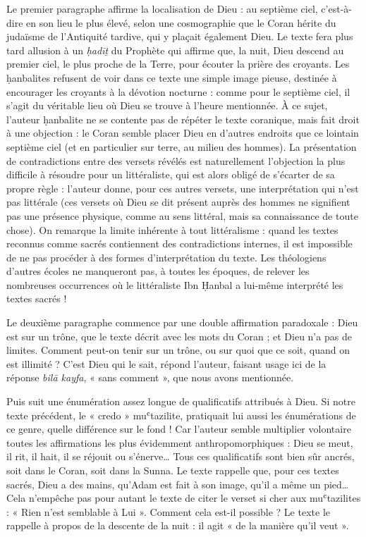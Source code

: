 Le premier paragraphe affirme la localisation de Dieu : au septième
ciel, c'est-à-dire en son lieu le plus élevé, selon une cosmographie que
le Coran hérite du judaïsme de l'Antiquité tardive, qui y plaçait
également Dieu. Le texte fera plus tard allusion à un \emph{ḥadīṯ} du
Prophète qui affirme que, la nuit, Dieu descend au premier ciel, le plus
proche de la Terre, pour écouter la prière des croyants. Les ḥanbalites
refusent de voir dans ce texte une simple image pieuse, destinée à
encourager les croyants à la dévotion nocturne : comme pour le septième
ciel, il s'agit du véritable lieu où Dieu se trouve à l'heure
mentionnée. À ce sujet, l'auteur ḥanbalite ne se contente pas de répéter
le texte coranique, mais fait droit à une objection : le Coran semble
placer Dieu en d'autres endroits que ce lointain septième ciel (et en
particulier sur terre, au milieu des hommes). La présentation de
contradictions entre des versets révélés est naturellement l'objection
la plus difficile à résoudre pour un littéraliste, qui est alors obligé
de s'écarter de sa propre règle : l'auteur donne, pour ces autres
versets, une interprétation qui n'est pas littérale (ces versets où Dieu
se dit présent auprès des hommes ne signifient pas une présence
physique, comme au sens littéral, mais sa connaissance de toute chose).
On remarque la limite inhérente à tout littéralisme : quand les textes
reconnus comme sacrés contiennent des contradictions internes, il est
impossible de
ne pas procéder à des formes d'interprétation du texte. Les théologiens
d'autres écoles ne manqueront pas, à toutes les époques, de relever les
nombreuses occurrences où le littéraliste Ibn Ḥanbal a lui-même
interprété les textes sacrés !

Le deuxième paragraphe commence par une double affirmation paradoxale :
Dieu est sur un trône, que le texte décrit avec les mots du Coran ; et
Dieu n'a pas de limites. Comment peut-on tenir sur un trône, ou sur quoi
que ce soit, quand on est illimité ? C'est Dieu qui le sait, répond
l'auteur, faisant usage ici de la réponse \emph{bilā kayfa}, « sans
comment », que nous avons mentionnée.

Puis suit une énumération assez longue de qualificatifs attribués à
Dieu. Si notre texte précédent, le « credo » muʿtazilite, pratiquait lui
aussi les énumérations de ce genre, quelle différence sur le fond ! Car
l'auteur semble multiplier volontaire toutes les affirmations les plus
évidemment anthropomorphiques : Dieu se meut, il rit, il hait, il se
réjouit ou s'énerve\ldots{} Tous ces qualificatifs sont bien sûr ancrés,
soit dans le Coran, soit dans la Sunna. Le texte rappelle que, pour ces
textes sacrés, Dieu a des mains, qu'Adam est fait à son image, qu'il a
même un pied\ldots{} Cela n'empêche pas pour autant le texte de citer le
verset si cher aux muʿtazilites : « Rien n'est semblable à Lui ».
Comment cela est-il possible ? Le texte le rappelle à propos de la
descente de la nuit : il agit « de la manière qu'il veut ».

